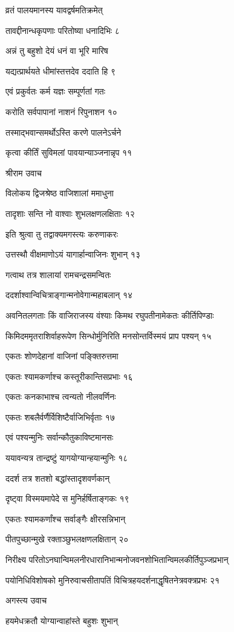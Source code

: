 व्रतं पालयमानस्य यावद्वर्षमतिक्रमेत्

तावद्दीनान्धकृपणाः परितोष्या धनादिभिः ८

अन्नं तु बहुशो देयं धनं वा भूरि मारिष

यद्यत्प्रार्थयते धीमांस्तत्तदेव ददाति हि ९

एवं प्रकुर्वतः कर्म यज्ञः सम्पूर्णतां गतः

करोति सर्वपापानां नाशनं रिपुनाशन १०

तस्माद्भवान्समर्थोऽस्ति करणे पालनेऽर्चने

कृत्वा कीर्तिं सुविमलां पावयान्याञ्जनान्नृप ११

श्रीराम उवाच

विलोकय द्विजश्रेष्ठ वाजिशालां ममाधुना

तादृशाः सन्ति नो वाश्वाः शुभलक्षणलक्षिताः १२

इति श्रुत्वा तु तद्वाक्यमगस्त्यः करुणाकरः

उत्तस्थौ वीक्षमाणोऽयं यागार्हान्वाजिनः शुभान् १३

गत्वाथ तत्र शालायां रामचन्द्रसमन्वितः

ददर्शाश्वान्विचित्राङ्गान्मनोवेगान्महाबलान् १४

अवनितलगताः किं वाजिराजस्य वंश्याः किमथ रघुपतीनामेकतः कीर्तिपिण्डाः

किमिदममृतराशिर्वाहरूपेण सिन्धोर्मुनिरिति मनसोन्तर्विस्मयं प्राप पश्यन् १५

एकतः शोणदेहानां वाजिनां पङ्क्तिरुत्तमा

एकतः श्यामकर्णाश्च कस्तूरीकान्तिसप्रभाः १६

एकतः कनकाभाश्च त्वन्यतो नीलवर्णिनः

एकतः शबलैर्वर्णैर्विशिष्टैर्वाजिभिर्वृताः १७

एवं पश्यन्मुनिः सर्वान्कौतुकाविष्टमानसः

ययावन्यत्र तान्द्रष्टुं यागयोग्यान्हयान्मुनिः १८

ददर्श तत्र शतशो बद्धांस्तादृशवर्णकान्

दृष्ट्वा विस्मयमापेदे स मुनिर्हर्षिताङ्गकः १९

एकतः श्यामकर्णांश्च सर्वाङ्गैः क्षीरसन्निभान्

पीतपुच्छान्मुखे रक्ताञ्छुभलक्षणलक्षितान् २०

निरीक्ष्य परितोऽनघान्विमलनीरधारानिभान्मनोजवनशोभितान्विमलकीर्तिपुञ्जप्रभान्

पयोनिधिविशोषको मुनिरुवाचसीतापतिं विचित्रहयदर्शनाद्धृषितनेत्रवक्त्रप्रभः २१

अगस्त्य उवाच

हयमेधक्रतौ योग्यान्वाहांस्ते बहुशः शुभान्

